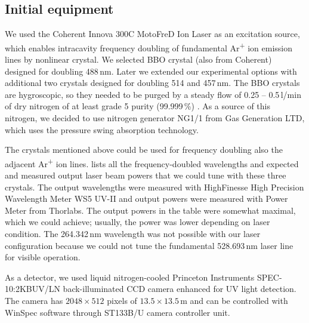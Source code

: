 \subsection{Initial equipment}
\label{initial_equipment}

We used the Coherent Innova 300C MotoFreD\texttrademark{} Ion Laser as an
excitation source, which enables intracavity frequency doubling
\parencite{Asher1993b}
of fundamental Ar\textsuperscript{+} ion emission lines by nonlinear crystal.
We selected BBO crystal (also from Coherent) designed for doubling 488\,nm.
Later we extended our experimental options with additional two crystals
designed for doubling 514 and 457\,nm.
The BBO crystals are hygroscopic, so they needed to be purged by a steady flow
of 0.25 -- 0.5\,l/min of dry nitrogen of at least grade 5 purity (99.999\,\%)
\parencite{Innova300MotoFreDManual}.
As a source of this nitrogen, we decided to use nitrogen generator NG1/1 from
Gas Generation LTD, which uses the pressure swing absorption technology.

The crystals mentioned above could be used for frequency doubling also the
adjacent Ar\textsuperscript{+} ion lines.
 lists all the frequency-doubled
wavelengths and expected and measured output laser beam powers that we could
tune with these three crystals.
The output wavelengths were measured with HighFinesse High Precision Wavelength
Meter WS5 UV-II and output powers were measured with Power Meter from Thorlabs.
The output powers in the table were somewhat maximal, which we could achieve;
usually, the power was lower depending on laser condition.
The 264.342\,nm wavelength was not possible with our laser configuration
because we could not tune the fundamental 528.693\,nm laser line for visible
operation.

\begin{table}
	\centering
	
	\caption[%
		Specifications of laser power of frequency-doubled lines.%
	]{%
		$P_\text{e}$ denotes expected laser power, and $P_\text{m}$ measured laser
		powers.
		The wavelengths are measured in air at 20\,\textcelsius{}.
	}
	\label{\tablabel{initial_equipment:laser_power_spec}}
\end{table}

As a detector, we used liquid nitrogen-cooled Princeton Instruments
SPEC-10:2KBUV/LN back-illuminated CCD camera enhanced for UV light detection.
The camera has $2048\times512$ pixels of $13.5\times13.5$\,m and can
be controlled with WinSpec software through ST133B/U camera controller unit.
